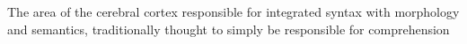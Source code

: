 The area of the cerebral cortex responsible for integrated syntax with morphology and semantics, traditionally thought to simply be responsible for comprehension
